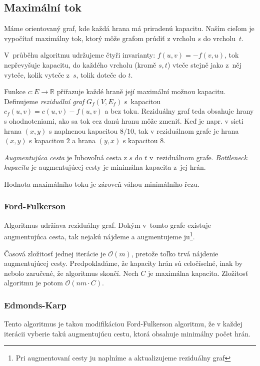 \subsection{Maximální tok}
Máme orientovaný graf, kde každá hrana má priradenú kapacitu.
Naším cieľom je vypočítať maximálny tok, ktorý môže
grafom prúdiť z vrcholu $s$ do vrcholu~$t$.

V~průběhu algoritmu udržujeme čtyři invarianty:
$f(u,v) = -f(v,u)$, tok nepřevyšuje kapacitu,
do každého vrcholu (kromě $s,t$) vteče stejně jako z~něj vyteče,
kolik vyteče z~$s$, tolik doteče do $t$.

Funkce $c : E \to \mathbb{R}$ přiřazuje každé hraně její maximální
možnou kapacitu. Definujeme {\em reziduální graf}
$G_{f}(V,E_{f})$ s~kapacitou $c_{f}(u,v)=c(u,v)-f(u,v)$ a bez toku.
Reziduálny graf teda obsahuje hrany s ohodnoteniami, ako sa tok
cez danú hranu môže zmeniť. Keď je napr. v sieti hrana $(x,y)$
s naplnenou kapacitou $8/10$, tak v reziduálnom grafe je
hrana $(x,y)$ s kapacitou $2$ a hrana $(y,x)$ s kapacitou $8$.

{\em Augmentujúca cesta} je ľubovoľná cesta z $s$ do $t$
v~reziduálnom grafe. {\em Bottleneck kapacita} je augmentujúcej
cesty je minimálna kapacita z~jej hrán.

\begin{theorem}
Hodnota maximálního toku je zároveň váhou minimálního řezu.
\end{theorem}

\subsubsection*{Ford-Fulkerson}
Algoritmus udržiava reziduálny graf. Dokým v~tomto grafe
existuje augmentujúca cesta, tak nejakú nájdeme a 
augmentujeme ju\footnote{Pri augmentovaní cesty ju naplníme 
a aktualizujeme reziduálny graf}.

Časová zložitosť jednej iterácie je $\mathcal{O}(m)$, pretože
toľko trvá nájdenie augmentujúcej cesty. Predpokladáme, že 
kapacity hrán sú celočíselné, inak by nebolo zaručené, že algoritmus skončí. 
Nech $C$ je maximálna kapacita. Zložitosť algoritmu je potom $\mathcal{O}(nm \cdot C)$.

\subsubsection*{Edmonds-Karp}

Tento algoritmus je takou modifikáciou Ford-Fulkerson algoritmu,
že v každej iterácii vyberie takú augmentujúcu cestu, ktorá obsahuje
minimálny počet hrán.

